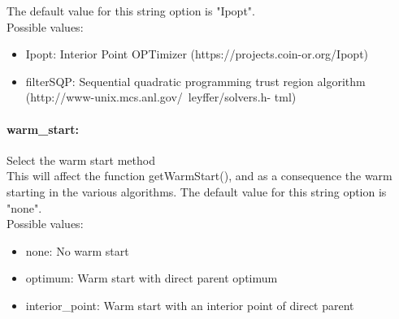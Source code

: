 The default value for this string option is "Ipopt".
\\ 
Possible values:
\begin{itemize}
   \item Ipopt: Interior Point OPTimizer
(https://projects.coin-or.org/Ipopt)
   \item filterSQP: Sequential quadratic programming trust region
algorithm
(http://www-unix.mcs.anl.gov/~leyffer/solvers.h-
tml)
\end{itemize}

\paragraph{warm\_start:} Select the warm start method $\;$ \\
 This will affect the function getWarmStart(), and
as a consequence the warm starting in the various
algorithms.
The default value for this string option is "none".
\\ 
Possible values:
\begin{itemize}
   \item none: No warm start
   \item optimum: Warm start with direct parent optimum
   \item interior\_point: Warm start with an interior point of direct
parent
\end{itemize}

